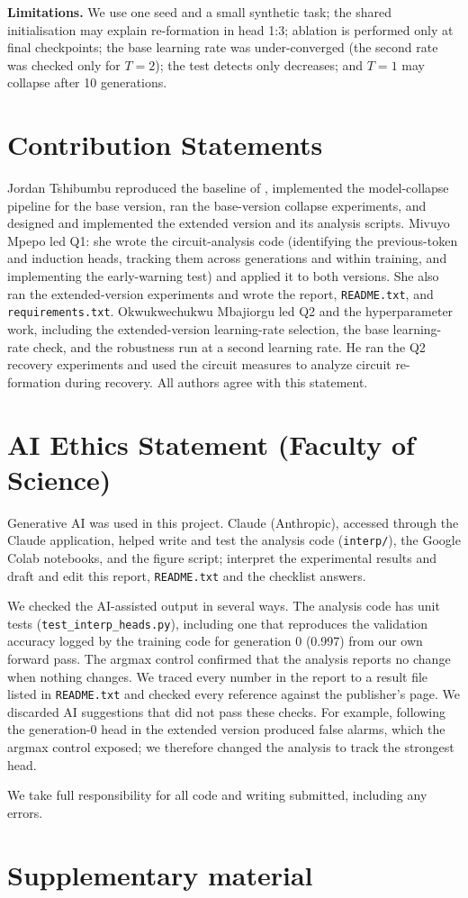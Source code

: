 \documentclass[10pt,letterpaper]{article}
\begin{document}
\textbf{Limitations.} We use one seed and a small synthetic task; the shared initialisation may explain re-formation in head 1:3; ablation is performed only at final checkpoints; the base learning rate was under-converged (the second rate was checked only for $T{=}2$); the test detects only decreases; and $T{=}1$ may collapse after 10 generations.

\section{Contribution Statements}
Jordan Tshibumbu reproduced the baseline of \citet{singh2024needs}, implemented the model-collapse pipeline for the base version, ran the base-version collapse experiments, and designed and implemented the extended version and its analysis scripts. Mivuyo Mpepo led Q1: she wrote the circuit-analysis code (identifying the previous-token and induction heads, tracking them across generations and within training, and implementing the early-warning test) and applied it to both versions. She also ran the extended-version experiments and wrote the report, \texttt{README.txt}, and \texttt{requirements.txt}. Okwukwechukwu Mbajiorgu led Q2 and the hyperparameter work, including the extended-version learning-rate selection, the base learning-rate check, and the robustness run at a second learning rate. He ran the Q2 recovery experiments and used the circuit measures to analyze circuit re-formation during recovery. All authors agree with this statement.


\setlength{\bibleftmargin}{.125in}
\setlength{\bibindent}{-\bibleftmargin}



\onecolumn
\appendix


\clearpage
\section*{AI Ethics Statement (Faculty of Science)}
Generative AI was used in this project. Claude (Anthropic), accessed through the Claude application, helped write and test the analysis code (\texttt{interp/}), the Google Colab notebooks, and the figure script; interpret the experimental results and draft and edit this report, \texttt{README.txt} and the checklist answers.

We checked the AI-assisted output in several ways. The analysis code has unit tests (\texttt{test\_interp\_heads.py}), including one that reproduces the validation accuracy logged by the training code for generation 0 (0.997) from our own forward pass. The argmax control confirmed that the analysis reports no change when nothing changes. We traced every number in the report to a result file listed in \texttt{README.txt} and checked every reference against the publisher's page. We discarded AI suggestions that did not pass these checks. For example, following the generation-0 head in the extended version produced false alarms, which the argmax control exposed; we therefore changed the analysis to track the strongest head.

We take full responsibility for all code and writing submitted, including any errors.

\clearpage
\section*{Supplementary material}

\end{document}
